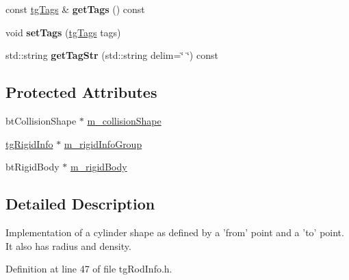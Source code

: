 \begin{DoxyCompactItemize}
\item 
\hypertarget{classtg_taggable_ae70d7d3b45301665bc363b0ed8b9b292}{const \hyperlink{classtg_tags}{tg\-Tags} \& {\bfseries get\-Tags} () const }\label{classtg_taggable_ae70d7d3b45301665bc363b0ed8b9b292}

\item 
\hypertarget{classtg_taggable_a5492888e4e4da4cca6261070b5726adf}{void {\bfseries set\-Tags} (\hyperlink{classtg_tags}{tg\-Tags} tags)}\label{classtg_taggable_a5492888e4e4da4cca6261070b5726adf}

\item 
\hypertarget{classtg_taggable_a346d66b066d2d9eb1eadba01da43749f}{std\-::string {\bfseries get\-Tag\-Str} (std\-::string delim=\char`\"{} \char`\"{}) const }\label{classtg_taggable_a346d66b066d2d9eb1eadba01da43749f}

\end{DoxyCompactItemize}
\subsection*{Protected Attributes}
\begin{DoxyCompactItemize}
\item 
bt\-Collision\-Shape $\ast$ \hyperlink{classtg_rigid_info_a8a1c3ca00fe917c90d035e2ac101d4b1}{m\-\_\-collision\-Shape}
\item 
\hyperlink{classtg_rigid_info}{tg\-Rigid\-Info} $\ast$ \hyperlink{classtg_rigid_info_a410205a69125205c4d63883e1fcfb0ae}{m\-\_\-rigid\-Info\-Group}
\item 
bt\-Rigid\-Body $\ast$ \hyperlink{classtg_rigid_info_ab6e331d7cb329704f24a069ff3c309f3}{m\-\_\-rigid\-Body}
\end{DoxyCompactItemize}


\subsection{Detailed Description}
Implementation of a cylinder shape as defined by a 'from' point and a 'to' point. It also has radius and density. 

Definition at line 47 of file tg\-Rod\-Info.\-h.



